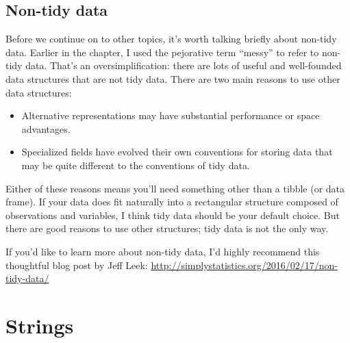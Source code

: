 \documentclass[]{book}
\newenvironment{Shaded}{\begin{snugshade}}{\end{snugshade}}
\newcommand{\KeywordTok}[1]{\textcolor[rgb]{0.13,0.29,0.53}{\textbf{#1}}}
\newcommand{\StringTok}[1]{\textcolor[rgb]{0.31,0.60,0.02}{#1}}
\newcommand{\CommentTok}[1]{\textcolor[rgb]{0.56,0.35,0.01}{\textit{#1}}}
\newcommand{\OperatorTok}[1]{\textcolor[rgb]{0.81,0.36,0.00}{\textbf{#1}}}
\newcommand{\NormalTok}[1]{#1}
\begin{document}
\begin{Shaded}
\end{Shaded}

\section{Non-tidy data}\label{non-tidy-data}

Before we continue on to other topics, it's worth talking briefly about
non-tidy data. Earlier in the chapter, I used the pejorative term
``messy'' to refer to non-tidy data. That's an oversimplification: there
are lots of useful and well-founded data structures that are not tidy
data. There are two main reasons to use other data structures:

\begin{itemize}
\item
  Alternative representations may have substantial performance or space
  advantages.
\item
  Specialized fields have evolved their own conventions for storing data
  that may be quite different to the conventions of tidy data.
\end{itemize}

Either of these reasons means you'll need something other than a tibble
(or data frame). If your data does fit naturally into a rectangular
structure composed of observations and variables, I think tidy data
should be your default choice. But there are good reasons to use other
structures; tidy data is not the only way.

If you'd like to learn more about non-tidy data, I'd highly recommend
this thoughtful blog post by Jeff Leek:
\url{http://simplystatistics.org/2016/02/17/non-tidy-data/}

\hypertarget{strings}{\chapter{Strings}\label{strings}}
\end{document}
